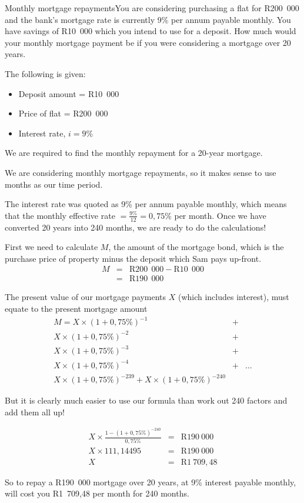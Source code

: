 \begin{wex}{Monthly mortgage repayments}{You are considering purchasing a flat for R200~000 and the bank's mortgage rate is currently 9\% per annum payable monthly. You have savings of R10~000 which you intend to use for a deposit. How much would your monthly mortgage payment be if you were considering a mortgage over 20 years.}{
The following is given:
\begin{itemize}
\item{Deposit amount = R10~000}
\item{Price of flat = R200~000}
\item{Interest rate, $i=9\%$}
\end{itemize}
We are required to find the monthly repayment for a 20-year mortgage.

We are considering monthly mortgage repayments, so it makes sense to use months as our time period.

The interest rate was quoted as 9\% per annum payable monthly, which means that the monthly effective rate $= \frac{9\%}{12} = 0,75\%$ per month. Once we have converted 20 years into 240 months, we are ready to do the calculations!

First we need to calculate $M$, the amount of the mortgage bond, which is the purchase price of property minus the deposit which Sam pays up-front.
\begin{eqnarray*}
M &=& \mbox{R}200\:~000 - \mbox{R}10\:~000\\
&=& \mbox{R}190\:~000
\end{eqnarray*}

The present value of our mortgage payments $X$ (which includes interest), must equate to the present mortgage amount
\begin{eqnarray*}
M = X\times (1 + 0,75\%)^{-1}&+& \\
X\times (1 + 0,75\%)^{-2}&+& \\
X\times (1 + 0,75\%)^{-3}&+& \\
X\times (1 + 0,75\%)^{-4} &+& \ldots \\
X\times (1 + 0,75\%)^{-239}+ X\times (1 + 0,75\%)^{-240}
\end{eqnarray*}

But it is clearly much easier to use our formula than work out 240 factors and add them all up!

\begin{eqnarray*}
X \times \frac{1 - (1 + 0,75\%)^{-240}}{0,75\%} &=& \mbox{R}190~000\\
X \times 111,14495 &=& \mbox{R}190~000\\
X &=& \mbox{R}1~709,48
\end{eqnarray*}

So to repay a R190~000 mortgage over 20 years, at 9\% interest payable monthly, will cost you R1~709,48 per month for 240 months.}
\end{wex}

